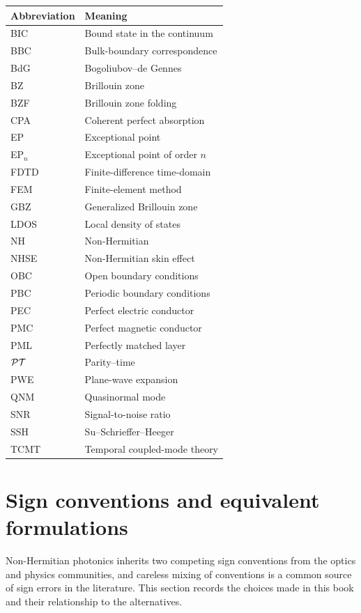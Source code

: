 \begin{center}
\begin{tabular}{ll}
\toprule
Abbreviation & Meaning \\
\midrule
BIC & Bound state in the continuum \\
BBC & Bulk-boundary correspondence \\
BdG & Bogoliubov--de Gennes \\
BZ & Brillouin zone \\
BZF & Brillouin zone folding \\
CPA & Coherent perfect absorption \\
EP & Exceptional point \\
EP$_n$ & Exceptional point of order $n$ \\
FDTD & Finite-difference time-domain \\
FEM & Finite-element method \\
GBZ & Generalized Brillouin zone \\
LDOS & Local density of states \\
NH & Non-Hermitian \\
NHSE & Non-Hermitian skin effect \\
OBC & Open boundary conditions \\
PBC & Periodic boundary conditions \\
PEC & Perfect electric conductor \\
PMC & Perfect magnetic conductor \\
PML & Perfectly matched layer \\
$\mathcal{PT}$ & Parity--time \\
PWE & Plane-wave expansion \\
QNM & Quasinormal mode \\
SNR & Signal-to-noise ratio \\
SSH & Su--Schrieffer--Heeger \\
TCMT & Temporal coupled-mode theory \\
\bottomrule
\end{tabular}
\end{center}


\section{Sign conventions and equivalent formulations}
\label{sec:sign-conventions}

Non-Hermitian photonics inherits two competing sign conventions from
the optics and physics communities, and careless mixing of conventions
is a common source of sign errors in the literature. This section
records the choices made in this book and their relationship to the
alternatives.

